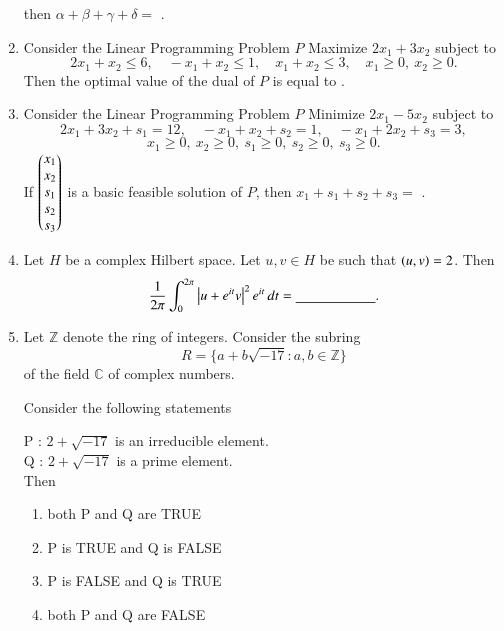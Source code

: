 \documentclass[journal,12pt,onecolumn]{IEEEtran}
\theoremstyle{remark}
\begin{document}
\begin{enumerate}[start=1, label=Q.\arabic*]
then $\alpha+\beta+\gamma+\delta=$ \underline{\hspace{2cm}}.

\hfill{}
\item Consider the Linear Programming Problem $P$\brak{:}  
Maximize $2x_{1}+3x_{2}$  
subject to
\[
2x_{1}+x_{2}\leq 6,\quad -x_{1}+x_{2}\leq 1,\quad x_{1}+x_{2}\leq 3,\quad x_{1}\geq 0,\ x_{2}\geq 0.
\]  
Then the optimal value of the dual of $P$ is equal to \underline{\hspace{2cm}}.

\hfill{}


\item Consider the Linear Programming Problem $P$\brak{:}  
Minimize $2x_{1}-5x_{2}$  
subject to
\[
2x_{1}+3x_{2}+s_{1}=12,\quad -x_{1}+x_{2}+s_{2}=1,\quad -x_{1}+2x_{2}+s_{3}=3,
\]
\[
x_{1}\geq 0,\ x_{2}\geq 0,\ s_{1}\geq 0,\ s_{2}\geq 0,\ s_{3}\geq 0.
\]  
If $\begin{pmatrix}x_{1}\\x_{2}\\s_{1}\\s_{2}\\s_{3}\end{pmatrix}$ is a basic feasible solution of $P$, then $x_{1}+s_{1}+s_{2}+s_{3}=$ \underline{\hspace{2cm}}.

\hfill{}


\item Let $H$ be a complex Hilbert space. Let $u,v \in H$ be such that $\left(u,v\right)=2$. Then
\[
\dfrac{1}{2\pi}\int_{0}^{2\pi}\left\vert u+e^{it}v\right\vert^{2}e^{it}\,dt=\underline{\hspace{2cm}}.
\]

\hfill{}

\item Let $\mathbb{Z}$ denote the ring of integers. Consider the subring
\[
R=\{a+b\sqrt{-17}: a,b \in \mathbb{Z}\}
\]
of the field $\mathbb{C}$ of complex numbers.  

Consider the following statements\brak{:}

P : $2+\sqrt{-17}$ is an irreducible element.\\
Q : $2+\sqrt{-17}$ is a prime element.\\

Then
\begin{enumerate}
\item both P and Q are TRUE
\item P is TRUE and Q is FALSE
\item P is FALSE and Q is TRUE
\item both P and Q are FALSE
\end{enumerate}


\end{enumerate}
\end{document}
